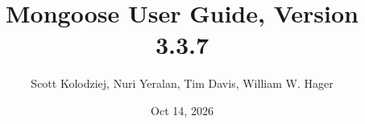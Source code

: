 \title{Mongoose User Guide, Version 3.3.7}
\author{Scott Kolodziej, Nuri Yeralan, Tim Davis, William W. Hager}
\date{Oct 14, 2026}
